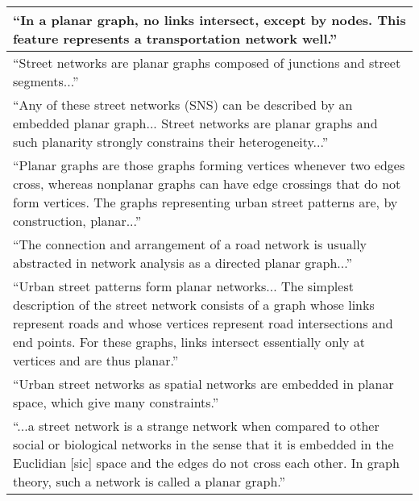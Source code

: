 \begin{tabular}{ | p{\textwidth} | }

\hline

\enquote{In a planar graph, no links intersect, except by nodes. This feature represents a transportation network well.} \citep[p.~6]{dill_measuring_2004} \\ \hline

\enquote{Street networks are planar graphs composed of junctions and street segments...} \citep[p.~18]{batty_network_2005} \\ \hline

\enquote{Any of these street networks (SNS) can be described by an embedded planar graph... Street networks are planar graphs and such planarity strongly constrains their heterogeneity...} \citep[pp.~514~\&~521]{buhl_topological_2006} \\ \hline

\enquote{Planar graphs are those graphs forming vertices whenever two edges cross, whereas nonplanar graphs can have edge crossings that do not form vertices. The graphs representing urban street patterns are, by construction, planar...} \citep[p.~3]{cardillo_structural_2006} \\ \hline

\enquote{The connection and arrangement of a road network is usually abstracted in network analysis as a directed planar graph...} \citep[p.~340]{xie_measuring_2007} \\ \hline

\enquote{Urban street patterns form planar networks... The simplest description of the street network consists of a graph whose links represent roads and whose vertices represent road intersections and end points. For these graphs, links intersect essentially only at vertices and are thus planar.} \citep[p.~1]{barthelemy_modeling_2008} \\ \hline

\enquote{Urban street networks as spatial networks are embedded in planar space, which give many constraints.} \citep[p.~1]{hu_topological_2008} \\ \hline

\enquote{...a street network is a strange network when compared to other social or biological networks in the sense that it is embedded in the Euclidian [sic] space and the edges do not cross each other. In graph theory, such a network is called a planar graph.} \citep[p.~259]{masucci_random_2009} \\ \hline


\end{tabular}
